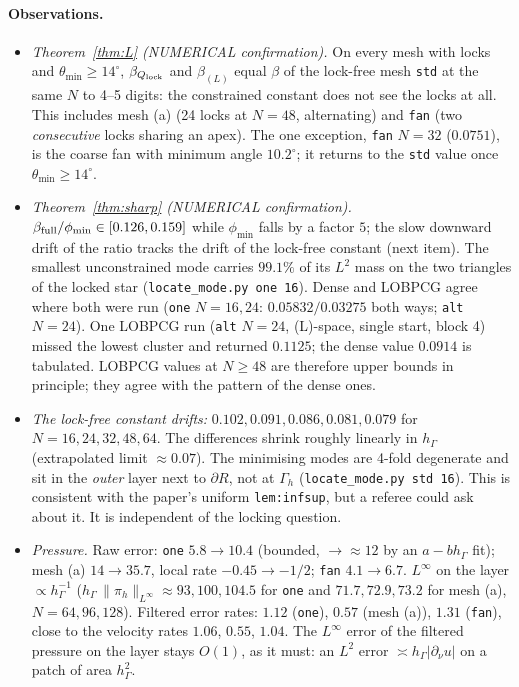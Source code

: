 \documentclass[11pt]{article}
\theoremstyle{remark}
\newcommand{\hG}{h_\Gamma}
\newcommand{\dn}{\partial_\nu}
\newcommand{\norm}[1]{\|#1\|}
\newcommand{\Ql}{Q_{\rm lock}}
\begin{document}
\paragraph{Observations.}
\begin{itemize}
\item \emph{Theorem~\ref{thm:L} (NUMERICAL confirmation).} On every mesh with locks and $\theta_{\min}\ge14^\circ$,
$\beta_{\Ql}$ and $\beta_{(L)}$ equal $\beta$ of the lock-free mesh \texttt{std} at the same $N$ to 4--5 digits:
the constrained constant does not see the locks at all. This includes mesh (a) (24 locks at $N=48$, alternating) and
\texttt{fan} (two \emph{consecutive} locks sharing an apex). The one exception, \texttt{fan} $N=32$ ($0.0751$), is the
coarse fan with minimum angle $10.2^\circ$; it returns to the \texttt{std} value once $\theta_{\min}\ge14^\circ$.
\item \emph{Theorem~\ref{thm:sharp} (NUMERICAL confirmation).} $\beta_{\rm full}/\phi_{\min}\in[0.126,0.159]$ while
$\phi_{\min}$ falls by a factor $5$; the slow downward drift of the ratio tracks the drift of the lock-free constant
(next item). The smallest unconstrained mode carries $99.1\%$ of its $L^2$ mass on the two triangles of the locked star
(\texttt{locate\_mode.py one 16}). Dense and LOBPCG agree where both were run
(\texttt{one} $N=16,24$: $0.05832/0.03275$ both ways; \texttt{alt} $N=24$). One LOBPCG run (\texttt{alt} $N=24$, (L)-space,
single start, block 4) missed the lowest cluster and returned $0.1125$; the dense value $0.0914$ is tabulated. LOBPCG
values at $N\ge48$ are therefore upper bounds in principle; they agree with the pattern of the dense ones.
\item \emph{The lock-free constant drifts:} $0.102,0.091,0.086,0.081,0.079$ for $N=16,24,32,48,64$. The differences shrink
roughly linearly in $\hG$ (extrapolated limit $\approx0.07$). The minimising modes are 4-fold degenerate and sit in the
\emph{outer} layer next to $\partial R$, not at $\Gamma_h$ (\texttt{locate\_mode.py std 16}). This is consistent with the
paper's uniform \texttt{lem:infsup}, but a referee could ask about it. It is independent of the locking question.
\item \emph{Pressure.} Raw error: \texttt{one} $5.8\to10.4$ (bounded, $\to\approx12$ by an $a-b\hG$ fit); mesh (a)
$14\to35.7$, local rate $-0.45\to-1/2$; \texttt{fan} $4.1\to6.7$. $L^\infty$ on the layer $\propto\hG^{-1}$
($\hG\,\norm{\pi_h}_{L^\infty}\approx93,100,104.5$ for \texttt{one} and $71.7,72.9,73.2$ for mesh (a), $N=64,96,128$). Filtered error rates:
$1.12$ (\texttt{one}), $0.57$ (mesh (a)), $1.31$ (\texttt{fan}), close to the velocity rates $1.06$, $0.55$, $1.04$.
The $L^\infty$ error of the filtered pressure on the layer stays $O(1)$, as it must: an $L^2$ error $\asymp\hG|\dn u|$ on a
patch of area $\hG^2$.
\end{itemize}
\end{document}
